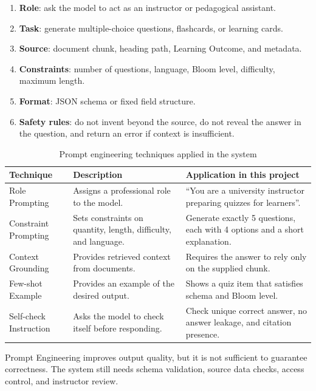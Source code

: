 \begin{enumerate}
    \item \textbf{Role}: ask the model to act as an instructor or
          pedagogical assistant.
    \item \textbf{Task}: generate multiple-choice questions, flashcards,
          or learning cards.
    \item \textbf{Source}: document chunk, heading path, Learning Outcome,
          and metadata.
    \item \textbf{Constraints}: number of questions, language, Bloom
          level, difficulty, maximum length.
    \item \textbf{Format}: JSON schema or fixed field structure.
    \item \textbf{Safety rules}: do not invent beyond the source, do not
          reveal the answer in the question, and return an error if
          context is insufficient.
\end{enumerate}

\begin{table}[H]
    \centering
    \caption{Prompt engineering techniques applied in the system}
    \label{tab:prompt-engineering-techniques}
    \begin{tabular}{p{3.4cm}p{4.6cm}p{5.5cm}}
        \toprule
        \textbf{Technique} & \textbf{Description} & \textbf{Application in this project} \\
        \midrule
        Role Prompting & Assigns a professional role to the model. & ``You are a university instructor preparing quizzes for learners''. \\
        Constraint Prompting & Sets constraints on quantity, length, difficulty, and language. & Generate exactly 5 questions, each with 4 options and a short explanation. \\
        Context Grounding & Provides retrieved context from documents. & Requires the answer to rely only on the supplied chunk. \\
        Few-shot Example & Provides an example of the desired output. & Shows a quiz item that satisfies schema and Bloom level. \\
        Self-check Instruction & Asks the model to check itself before responding. & Check unique correct answer, no answer leakage, and citation presence. \\
        \bottomrule
    \end{tabular}
\end{table}

Prompt Engineering improves output quality, but it is not sufficient to
guarantee correctness. The system still needs schema validation, source
data checks, access control, and instructor review.

